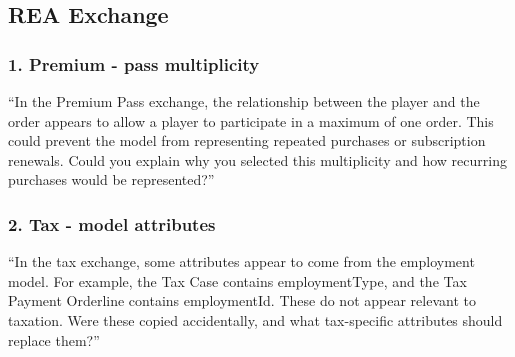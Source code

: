 \documentclass{article}
\begin{document}
\subsection{REA Exchange}

\subsubsection*{1.⁠ ⁠Premium - pass multiplicity}
“In the Premium Pass exchange, the relationship between the player and the order appears to allow a player to participate in a maximum of one order. This could prevent the model from representing repeated purchases or subscription renewals. Could you explain why you selected this multiplicity and how recurring purchases would be represented?”

\subsubsection*{2.⁠ ⁠Tax - model attributes}
“In the tax exchange, some attributes appear to come from the employment model. For example, the Tax Case contains employmentType, and the Tax Payment Orderline contains employmentId. These do not appear relevant to taxation. Were these copied accidentally, and what tax-specific attributes should replace them?”

\printbibliography
   
\end{document}
